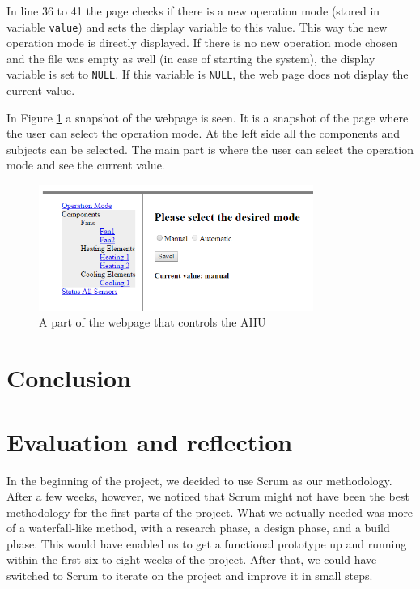 \documentclass[a4paper,oneside]{book}
\begin{document}
In line 36 to 41 the page checks if there is a new operation mode (stored in
variable \lstinline|value|) and sets the display variable to this value. This
way the new operation mode is directly displayed. If there is no new operation
mode chosen and the file was empty as well (in case of starting the system),
the display variable is set to \lstinline|NULL|. If this variable is
\lstinline|NULL|, the web page does not display the current value.

In Figure \ref{fig:webpage} a snapshot of the webpage is seen. It is a snapshot
of the page where the user can select the operation mode. At the left side all
the components and subjects can be selected. The main part is where the user
can select the operation mode and see the current value.

\begin{figure}[h]
\centering
\includegraphics[width=0.8\textwidth]{images/webpage.png}
\caption{A part of the webpage that controls the AHU}
\label{fig:webpage}
\end{figure}

\chapter{Conclusion}

\chapter{Evaluation and reflection}
In the beginning of the project, we decided to use Scrum as our methodology.
After a few weeks, however, we noticed that Scrum might not have been the best
methodology for the first parts of the project. What we actually needed was
more of a waterfall-like method, with a research phase, a design phase, and a
build phase. This would have enabled us to get a functional prototype up and
running within the first six to eight weeks of the project. After that, we
could have switched to Scrum to iterate on the project and improve it in small
steps.
\end{document}
